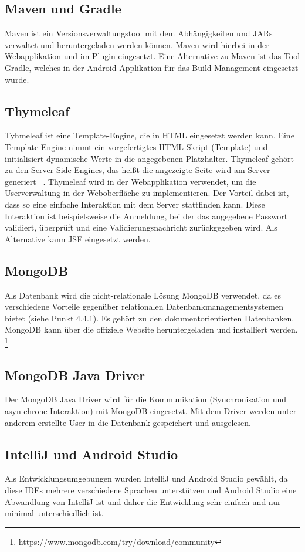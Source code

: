 \subsection{Maven und Gradle}
Maven ist ein Versionsverwaltungstool mit dem Abhängigkeiten und JARs verwaltet und heruntergeladen werden können. Maven wird hierbei in der Webapplikation und im Plugin eingesetzt. Eine Alternative zu Maven ist das Tool Gradle, welches in der Android Applikation für das Build-Management eingesetzt wurde.
\subsection{Thymeleaf}
Tyhmeleaf ist eine Template-Engine, die in HTML eingesetzt werden kann. Eine Template-Engine nimmt ein vorgefertigtes HTML-Skript (Template) und initialisiert dynamische Werte in die angegebenen Platzhalter. Thymeleaf gehört zu den Server-Side-Engines, das heißt die angezeigte Seite wird am Server generiert ~\parencite{searchmetrics}. Thymeleaf wird in der Webapplikation verwendet, um die Userverwaltung in der Weboberfläche zu implementieren. Der Vorteil dabei ist, dass so eine einfache Interaktion mit dem Server stattfinden kann. Diese Interaktion ist beispielsweise die Anmeldung, bei der das angegebene Passwort validiert, überprüft und eine Validierungsnachricht zurückgegeben wird. Als Alternative kann JSF eingesetzt werden. 
\subsection{MongoDB}
Als Datenbank wird die nicht-relationale Lösung MongoDB verwendet, da es verschiedene Vorteile gegenüber relationalen Datenbankmanagementsystemen bietet (siehe Punkt 4.4.1). Es gehört zu den dokumentorientierten Datenbanken. MongoDB kann über die offiziele Website heruntergeladen und installiert werden. \footnote{https://www.mongodb.com/try/download/community}
\subsection{MongoDB Java Driver}
Der MongoDB Java Driver wird für die Kommunikation (Synchronisation und asyn-chrone Interaktion) mit MongoDB eingesetzt. Mit dem Driver werden unter anderem erstellte User in die Datenbank gespeichert und ausgelesen.
\subsection{IntelliJ und Android Studio}
Als Entwicklungsumgebungen wurden IntelliJ und Android Studio gewählt, da diese IDEs mehrere verschiedene Sprachen unterstützen und Android Studio eine Abwandlung von IntelliJ ist und daher die Entwicklung sehr einfach und nur minimal unterschiedlich ist.
